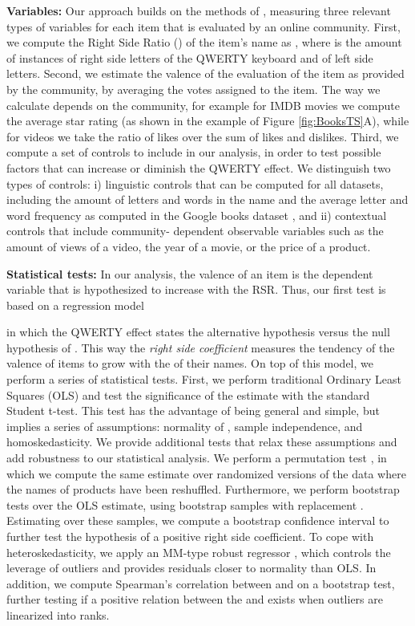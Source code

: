 \documentclass[letterpaper]{sig-alternate-2013}
\begin{document}
\textbf{Variables:} Our approach builds on the methods of \cite{Jasmin2012},
measuring three relevant types of variables for each item that is evaluated by
an online community. First, we compute the Right Side Ratio () of the
item's name as , where  is the amount of instances of right
side letters of the QWERTY keyboard and  of left side letters.  Second, we
estimate the valence  of the evaluation of the item as provided by the
community, by averaging the votes assigned to the item. The way we calculate
 depends on the community, for example for IMDB movies we compute the
average star rating (as shown in the example of Figure \ref{fig:BooksTS}A),
while for videos we take the ratio of likes over the sum of likes and
dislikes. Third, we compute a set of controls to include in our analysis, in
order to test possible factors that can increase or diminish  the QWERTY
effect. We distinguish two types of controls: i) linguistic controls that can
be computed for all datasets, including the amount of letters and words in the
name and the average letter and word frequency as computed in the Google books
dataset \cite{Lin2012}, and ii) contextual controls that include community-
dependent observable variables such as the amount of views of a video, the
year of a movie, or the price of a product.

\textbf{Statistical tests:} In our analysis, the valence of an item is the
dependent variable that is hypothesized to increase with the RSR. Thus, our
first test  is based on a regression model

in which the QWERTY effect states the alternative hypothesis 
versus the null hypothesis of . This way the  \emph{right side
coefficient}  measures the tendency of the valence of items to grow with
the  of their names.  On top of this model, we perform a series of
statistical tests. First, we perform traditional Ordinary Least Squares (OLS)
and test the significance of the estimate  with the standard Student
t-test. This test has the advantage of being general and simple, but implies a
series of assumptions: normality of , sample independence, and
homoskedasticity. We provide additional tests that relax these assumptions and
add robustness to our statistical analysis. We perform a permutation test
\cite{Good2006}, in which we compute the same estimate  over 
randomized versions of the data where the names of products have been
reshuffled.   Furthermore, we perform bootstrap tests over the OLS estimate,
using  bootstrap samples with replacement \cite{Davison1997}.
Estimating  over these samples, we compute a bootstrap confidence
interval to further test the hypothesis of a positive right side coefficient.
To cope with heteroskedasticity, we apply an MM-type robust regressor
\cite{Yohai1987}, which controls the leverage of outliers and
provides residuals closer to normality than OLS. In addition, we compute
Spearman's correlation between  and  on a bootstrap test, further
testing if a positive relation between the  and  exists when outliers
are linearized into ranks.
\end{document}
